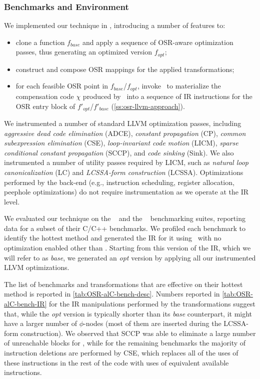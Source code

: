 \subsubsection*{Benchmarks and Environment}
We implemented our technique in \tinyvm, introducing a number of features to:
\begin{itemize}
 \item clone a function $f_{base}$ and apply a sequence of OSR-aware optimization passes, thus generating an optimized version $f_{opt}$;
 \item construct and compose OSR mappings for the applied transformations;
 \item for each feasible OSR point in $f_{base}$/$f_{opt}$, invoke \osrkit\ to materialize the compensation code $\chi$ produced by \reconstruct\ into a sequence of IR instructions for the OSR entry block of $f'_{opt}$/$f'_{base}$ (\mysection\ref{ss:osr-llvm-approach}).
\end{itemize}

\noindent We instrumented a number of standard LLVM optimization passes, including {\em aggressive dead code elimination} (ADCE), {\em constant propagation} (CP), {\em common subexpression elimination} (CSE), {\em loop-invariant code motion} (LICM), {\em sparse conditional constant propagation} (SCCP), and {\em code sinking} (Sink). We also instrumented a number of utility passes required by LICM, such as {\em natural loop canonicalization} (LC) and {\em LCSSA-form construction} (LCSSA). Optimizations performed by the back-end (e.g., instruction scheduling, register allocation, peephole optimizations) do not require instrumentation as we operate at the IR level.

We evaluated our technique on the \speccpu~\cite{Henning06} and the \phoronixpts~\cite{Phoronix} benchmarking suites, reporting data for a subset of their C/C++ benchmarks. We profiled each benchmark to identify the hottest method and generated the IR for it using \clang\ with no optimization enabled other than \memtoreg. Starting from this version of the IR, which we will refer to as {\em base}, we generated an {\em opt} version by applying all our instrumented LLVM optimizations.

The list of benchmarks and transformations that are effective on their hottest method is reported in \mytable\ref{tab:OSR-alC-bench-desc}. Numbers reported in \mytable\ref{tab:OSR-alC-bench-IR} for the IR manipulations performed by the transformations suggest that, while the {\em opt} version is typically shorter than its {\em base} counterpart, it might have a larger number of $\phi$-nodes (most of them are inserted during the LCSSA-form construction). We observed that SCCP was able to eliminate a large number of unreachable blocks for , while for the remaining benchmarks the majority of instruction deletions are performed by CSE, which replaces all of the uses of these instructions in the rest of the code with uses of equivalent available instructions.

